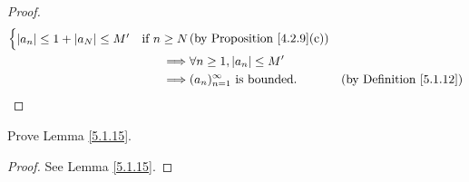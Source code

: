 \begin{proof}
\begin{align*}
\begin{cases}
                       \left\lvert a_n\right\rvert \leq 1 + \left\lvert a_N\right\rvert \leq M' & \text{if } n \geq N
                   \end{cases} & \text{(by Proposition \ref{4.2.9}(c))}                                          \\
        \implies & \forall n \geq 1, \left\lvert a_n\right\rvert \leq M'                                                                            \\
        \implies & (a_n)_{n = 1}^\infty \text{ is bounded}.                                 & \text{(by Definition \ref{5.1.12})}
    \end{align*}
\end{proof}

\exercisesection

\begin{exercise}\label{ex 5.1.1}
    Prove Lemma \ref{5.1.15}.
\end{exercise}

\begin{proof}
    See Lemma \ref{5.1.15}.
\end{proof}